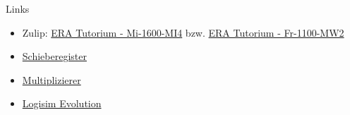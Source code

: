 \documentclass[
  german,            %
  aspectratio=169,    %
]{tumbeamer}
\begin{document}
\begin{frame}[fragile, c]{Links}{}
  \begin{itemize}
    \item Zulip: \href{https://zulip.in.tum.de/#narrow/stream/1917-ERA-Tutorium---Mi-1600-MI4}{\glqq ERA Tutorium - Mi-1600-MI4\grqq}
          bzw. \href{https://zulip.in.tum.de/#narrow/stream/1940-ERA-Tutorium---Fr-1100-MW2}{\glqq ERA Tutorium - Fr-1100-MW2\grqq}
    \item \href{https://de.wikipedia.org/wiki/Schieberegister}{Schieberegister}
    \item \href{https://de.wikipedia.org/wiki/Multiplizierer_(Digitaltechnik)}{Multiplizierer}
    \item \href{https://github.com/logisim-evolution/logisim-evolution/releases}{Logisim Evolution}
  \end{itemize}
\end{frame}

\maketitle
\end{document}
